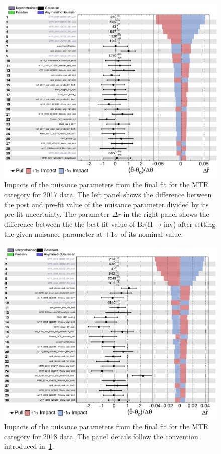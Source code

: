 \begin{figure}[htbp]
  \centering
   \includegraphics[width=\textwidth]{FIt_structure/impacts_perchannel_MTR_2017_p1.pdf}
   
  \caption{Impacts of the nuisance parameters from the final fit for the MTR category for 2017 data. The left panel shows the difference between the post and pre-fit value of the nuisance parameter divided by its pre-fit uncertainty. The parameter $\Delta r$ in the right panel shows the difference between the the best fit value of Br(H$\rightarrow$inv) after setting the given nuisance parameter at $\pm\text{1}\sigma$ of its nominal value.}
  \label{app:impacts_MTR_2017}
\end{figure}



\begin{figure}[htbp]
  \centering
   \includegraphics[width=\textwidth]{FIt_structure/impacts_perchannel_MTR_2018_p1.pdf}
   
  \caption{Impacts of the nuisance parameters from the final fit for the MTR category for 2018 data. The panel details follow the convention introduced in~\ref{app:impacts_MTR_2017}.}
  \label{app:impacts_MTR_2018}
\end{figure}


